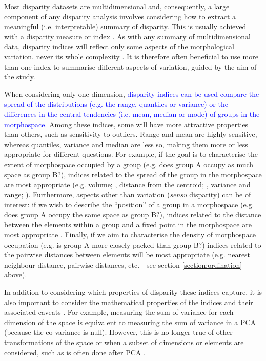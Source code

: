 \documentclass[12pt,letterpaper]{article}
\begin{document}
Most disparity datasets are multidimensional and, consequently, a large component of any disparity analysis involves considering how to extract a meaningful (i.e.
interpretable) summary of disparity.
This is usually achieved with a disparity measure or index \citep{Hopkins2017}.
As with any summary of multidimensional data, disparity indices will reflect only some aspects of the morphological variation, never its whole complexity \citep{GuillermeMOMS}.
It is therefore often beneficial to use more than one index to summarise different aspects of variation, guided by the aim of the study.

When considering only one dimension, \textcolor{blue}{disparity indices can be used compare the spread of the distributions (e.g. the range, quantiles or variance) or the differences in the central tendencies (i.e. mean, median or mode) of groups in the morphospace.}
Among these indices, some will have more attractive properties than others, such as sensitivity to outliers.
Range and mean are highly sensitive, whereas quantiles, variance and median are less so, making them more or less appropriate for different questions.
For example, if the goal is to characterise the extent of morphospace occupied by a group (e.g. does group A occupy as much space as group B?), indices related to the spread of the group in the morphospace are most appropriate (e.g.
volume; \citealt{Diaz2016}, distance from the centroid; \citealt{Hopkins2017, Finlay2015}, variance and range; \citealt{Brusatte2008}).
Furthermore, aspects other than variation (\textit{sensu} disparity) can be of interest: if we wish to describe the ``position'' of a group in a morphospace (e.g.
does group A occupy the same space as group B?), indices related to the distance between the elements within a group and a fixed point in the morphospace are most appropriate \citep{GuillermeMOMS}.
Finally, if we aim to characterise the density of morphospace occupation (e.g.
is group A more closely packed than group B?) indices related to the pairwise distances between elements will be most appropriate (e.g. nearest neighbour distance, pairwise distances, etc. \citealt{Close2015} - see section \ref{section:ordination} above).

In addition to considering which properties of disparity these indices capture, it is also important to consider the mathematical properties of the indices and their associated caveats \citep{Wills2001, Ciampaglio2001}.
For example, measuring the sum of variance for each dimension of the space is equivalent to measuring the sum of variance in a PCA (because the co-variance is null).
However, this is no longer true of other transformations of the space or when a subset of dimensions or elements are considered, such as is often done after PCA \citep{Legendre2012}.
\end{document}
